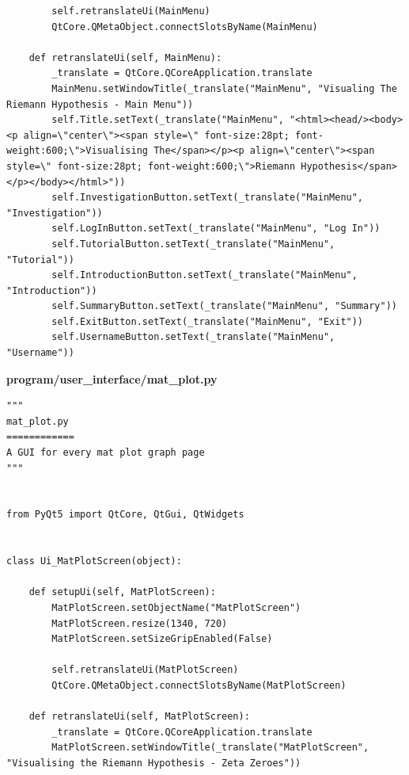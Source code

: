 \documentclass[12pt]{article}
\begin{document}
\begin{lstlisting}
        self.retranslateUi(MainMenu)
        QtCore.QMetaObject.connectSlotsByName(MainMenu)

    def retranslateUi(self, MainMenu):
        _translate = QtCore.QCoreApplication.translate
        MainMenu.setWindowTitle(_translate("MainMenu", "Visualing The Riemann Hypothesis - Main Menu"))
        self.Title.setText(_translate("MainMenu", "<html><head/><body><p align=\"center\"><span style=\" font-size:28pt; font-weight:600;\">Visualising The</span></p><p align=\"center\"><span style=\" font-size:28pt; font-weight:600;\">Riemann Hypothesis</span></p></body></html>"))
        self.InvestigationButton.setText(_translate("MainMenu", "Investigation"))
        self.LogInButton.setText(_translate("MainMenu", "Log In"))
        self.TutorialButton.setText(_translate("MainMenu", "Tutorial"))
        self.IntroductionButton.setText(_translate("MainMenu", "Introduction"))
        self.SummaryButton.setText(_translate("MainMenu", "Summary"))
        self.ExitButton.setText(_translate("MainMenu", "Exit"))
        self.UsernameButton.setText(_translate("MainMenu", "Username"))
\end{lstlisting}

\clearpage
\textbf{program/user\_interface/mat\_plot.py}
\begin{lstlisting}
"""
mat_plot.py
============
A GUI for every mat plot graph page
"""


from PyQt5 import QtCore, QtGui, QtWidgets


class Ui_MatPlotScreen(object):

    def setupUi(self, MatPlotScreen):
        MatPlotScreen.setObjectName("MatPlotScreen")
        MatPlotScreen.resize(1340, 720)
        MatPlotScreen.setSizeGripEnabled(False)

        self.retranslateUi(MatPlotScreen)
        QtCore.QMetaObject.connectSlotsByName(MatPlotScreen)

    def retranslateUi(self, MatPlotScreen):
        _translate = QtCore.QCoreApplication.translate
        MatPlotScreen.setWindowTitle(_translate("MatPlotScreen", "Visualising the Riemann Hypothesis - Zeta Zeroes"))
\end{lstlisting}
\end{document}
